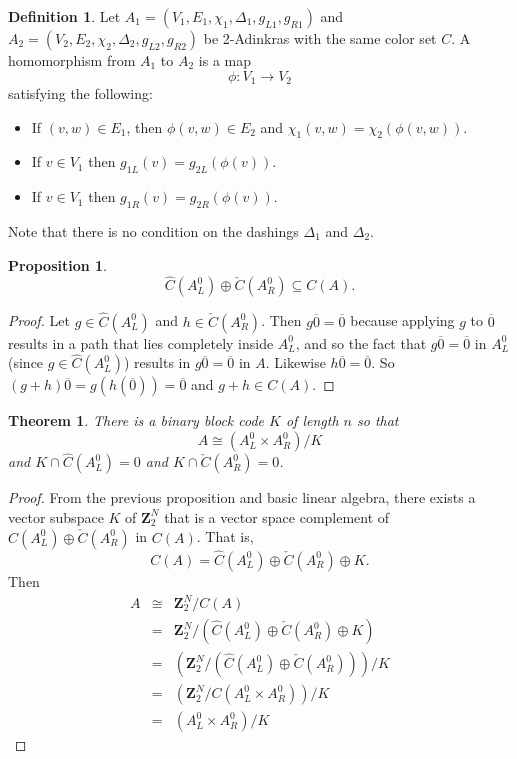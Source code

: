 \documentclass[12pt,twoside,singlespace]{article}
\numberwithin{equation}{section}
\newtheorem{thm}[equation]{Theorem}
\newtheorem{prop}[equation]{Proposition}
\theoremstyle{definition}
\newtheorem{definition}[equation]{Definition}
\newcommand{\ZZ}{\mathbf{Z}}
\begin{document}
\begin{definition}
Let 
$A_1=(V_1,E_1,\chi_1,\Delta_1,g_{L1},g_{R1})$
and
$A_2=(V_2,E_2,\chi_2,\Delta_2,g_{L2},g_{R2})$
be 2-Adinkras with the same color set $C$.  A homomorphism from $A_1$ to $A_2$ is a map
\[\phi:V_1\to V_2\]
satisfying the following:
\begin{itemize}
\item If $(v,w)\in E_1$, then $\phi(v,w)\in E_2$ and $\chi_1(v,w)=\chi_2(\phi(v,w))$.
\item If $v\in V_1$ then $g_{1L}(v)=g_{2L}(\phi(v))$.
\item If $v\in V_1$ then $g_{1R}(v)=g_{2R}(\phi(v))$.
\end{itemize}
Note that there is no condition on the dashings $\Delta_1$ and $\Delta_2$.
\end{definition}





\begin{prop}
\[\hat{C}(A_L^0)\oplus \check{C}(A_R^0) \subseteq C(A).\]
\end{prop}
\begin{proof}
Let $g\in\hat{C}(A_L^0)$ and $h\in \check{C}(A_R^0)$.  Then $g\overline{0}=\overline{0}$ because applying $g$ to $\overline{0}$ results in a path that lies completely inside $A_L^0$, and so the fact that $g\overline{0}=\overline{0}$ in $A_L^0$ (since $g\in \hat{C}(A_L^0)$) results in $g\overline{0}=\overline{0}$ in $A$.  Likewise $h\overline{0}=\overline{0}$.  So $(g+h)\overline{0}=g(h(\overline{0}))=\overline{0}$ and $g+h\in C(A)$.
\end{proof}

\begin{thm}
There is a binary block code $K$ of length $n$ so that
\[A\cong (A_L^0\times A_R^0)/K\]
and $K\cap \hat{C}(A_L^0)=0$ and $K\cap \check{C}(A_R^0)=0$.
\end{thm}
\begin{proof}
From the previous proposition and basic linear algebra, there exists a vector subspace $K$ of $\ZZ_2^N$ that is a vector space complement of
$\hat{C}(A_L^0)\oplus \check{C}(A_R^0)$ in $C(A)$.  That is,
\[C(A)=\hat{C}(A_L^0)\oplus \check{C}(A_R^0)\oplus K.\]
Then
\begin{eqnarray*}
A&\cong& \ZZ_2^N/C(A)\\
&=&\ZZ_2^N/(\hat{C}(A_L^0)\oplus \check{C}(A_R^0)\oplus K)\\
&=&(\ZZ_2^N/(\hat{C}(A_L^0)\oplus \check{C}(A_R^0)))/ K\\
&=&(\ZZ_2^N/C(A_L^0 \times A_R^0))/ K\\
&=&(A_L^0 \times A_R^0)/ K
\end{eqnarray*}


\end{proof}
\end{document}
